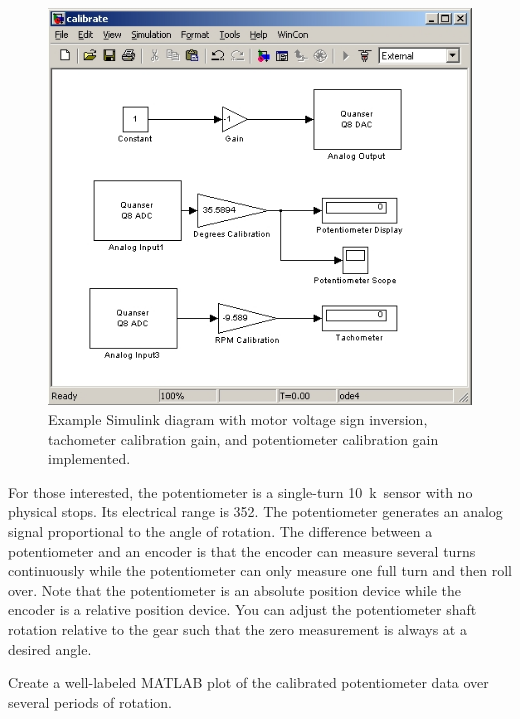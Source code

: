 \begin{figure}[bht]
\centering
\includegraphics[width=.6\textwidth]{finalcalibrationmodel}
\caption{\footnotesize
        Example Simulink diagram with motor voltage sign inversion, tachometer calibration gain, and potentiometer calibration gain implemented.
        \label{fig.finalcalibrationmodel}
        }
\end{figure}

\par
For those interested, the potentiometer is a single-turn 10~k\textohm\ sensor with no physical stops.  Its electrical range is 352\textdegree.  The potentiometer generates an analog signal proportional to the angle of rotation.  The difference between a potentiometer and an encoder is that the encoder can measure several turns continuously while the potentiometer can only measure one full turn and then roll over.  Note that the potentiometer is an absolute position device while the encoder is a relative position device.  You can adjust the potentiometer shaft rotation relative to the gear such that the zero measurement is always at a desired angle.
\par
Create a well-labeled MATLAB plot of the calibrated potentiometer data over several periods of rotation.
